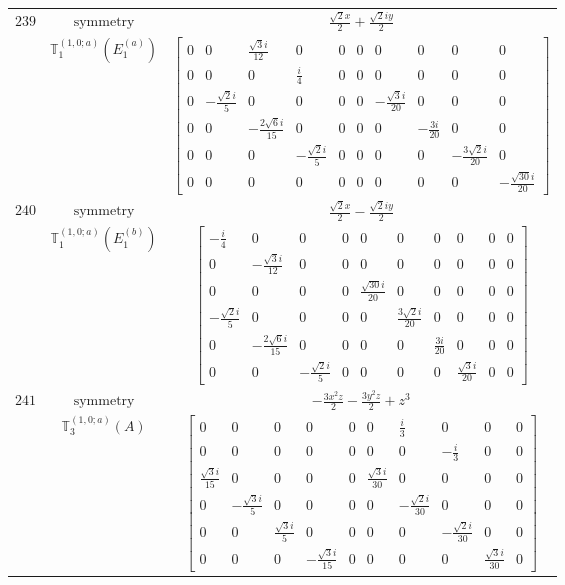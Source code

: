 \documentclass[fleqn,8pt,landscape]{jsarticle}
\begin{document}
\begin{longtable}{ccc}
$ 239 $ & $ \text{symmetry} $ & $ \frac{\sqrt{2} x}{2} + \frac{\sqrt{2} i y}{2} $ \\
$  $ & $ \mathbb{T}_{1}^{(1,0;a)}(E_{1}^{(a)}) $ & $ \begin{bmatrix} 0 & 0 & \frac{\sqrt{3} i}{12} & 0 & 0 & 0 & 0 & 0 & 0 & 0 \\ 0 & 0 & 0 & \frac{i}{4} & 0 & 0 & 0 & 0 & 0 & 0 \\ 0 & - \frac{\sqrt{2} i}{5} & 0 & 0 & 0 & 0 & - \frac{\sqrt{3} i}{20} & 0 & 0 & 0 \\ 0 & 0 & - \frac{2 \sqrt{6} i}{15} & 0 & 0 & 0 & 0 & - \frac{3 i}{20} & 0 & 0 \\ 0 & 0 & 0 & - \frac{\sqrt{2} i}{5} & 0 & 0 & 0 & 0 & - \frac{3 \sqrt{2} i}{20} & 0 \\ 0 & 0 & 0 & 0 & 0 & 0 & 0 & 0 & 0 & - \frac{\sqrt{30} i}{20} \end{bmatrix} $ \\ \hline
$ 240 $ & $ \text{symmetry} $ & $ \frac{\sqrt{2} x}{2} - \frac{\sqrt{2} i y}{2} $ \\
$  $ & $ \mathbb{T}_{1}^{(1,0;a)}(E_{1}^{(b)}) $ & $ \begin{bmatrix} - \frac{i}{4} & 0 & 0 & 0 & 0 & 0 & 0 & 0 & 0 & 0 \\ 0 & - \frac{\sqrt{3} i}{12} & 0 & 0 & 0 & 0 & 0 & 0 & 0 & 0 \\ 0 & 0 & 0 & 0 & \frac{\sqrt{30} i}{20} & 0 & 0 & 0 & 0 & 0 \\ - \frac{\sqrt{2} i}{5} & 0 & 0 & 0 & 0 & \frac{3 \sqrt{2} i}{20} & 0 & 0 & 0 & 0 \\ 0 & - \frac{2 \sqrt{6} i}{15} & 0 & 0 & 0 & 0 & \frac{3 i}{20} & 0 & 0 & 0 \\ 0 & 0 & - \frac{\sqrt{2} i}{5} & 0 & 0 & 0 & 0 & \frac{\sqrt{3} i}{20} & 0 & 0 \end{bmatrix} $ \\ \hline
$ 241 $ & $ \text{symmetry} $ & $ - \frac{3 x^{2} z}{2} - \frac{3 y^{2} z}{2} + z^{3} $ \\
$  $ & $ \mathbb{T}_{3}^{(1,0;a)}(A) $ & $ \begin{bmatrix} 0 & 0 & 0 & 0 & 0 & 0 & \frac{i}{3} & 0 & 0 & 0 \\ 0 & 0 & 0 & 0 & 0 & 0 & 0 & - \frac{i}{3} & 0 & 0 \\ \frac{\sqrt{3} i}{15} & 0 & 0 & 0 & 0 & \frac{\sqrt{3} i}{30} & 0 & 0 & 0 & 0 \\ 0 & - \frac{\sqrt{3} i}{5} & 0 & 0 & 0 & 0 & - \frac{\sqrt{2} i}{30} & 0 & 0 & 0 \\ 0 & 0 & \frac{\sqrt{3} i}{5} & 0 & 0 & 0 & 0 & - \frac{\sqrt{2} i}{30} & 0 & 0 \\ 0 & 0 & 0 & - \frac{\sqrt{3} i}{15} & 0 & 0 & 0 & 0 & \frac{\sqrt{3} i}{30} & 0 \end{bmatrix} $ \\ \hline

\end{longtable}
\end{document}
